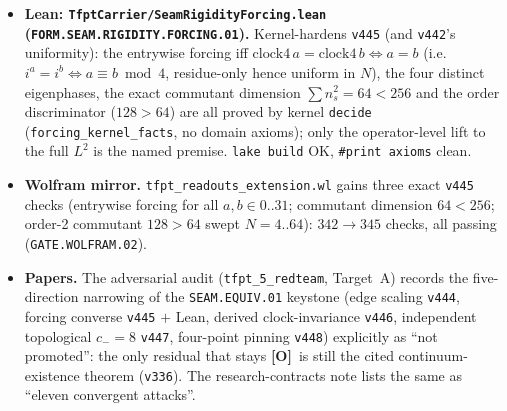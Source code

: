 \documentclass[11pt]{article}
\providecommand{\mE}{\textbf{[E]}}\providecommand{\mC}{\textbf{[C]}}
\providecommand{\mO}{\textbf{[O]}}\providecommand{\mX}{\textbf{[X]}}
\begin{document}
\begin{itemize}
external MMST fact (continuum existence of the chiral scaling limit) empirically at the next order. \mE\ the
ground-state correlation matrix is an exact projector $G^2{=}G$ ($\sim10^{-13}$), so the state is quasi-free (the
MMST CAR hypothesis holds); \mE\ the edge four-point cross-ratio $Q{=}[G_{01}G_{23}]/[G_{02}G_{13}]$ at commensurate
positions is Cauchy-convergent under refinement; \mE\ $Q$ converges to the free-fermion conformal cross-ratio
$\sin(5\pi/12)/\sin(\pi/12){=}2{+}\sqrt3\approx3.732$; \mE\ the bulk control is off-scale (exponential). \mC\ so the
one external fact is supported at \emph{both} two-point (\texttt{v444}) and four-point order. \texttt{SEAM.EQUIV.01}
stays \mO.
\item \textbf{Lean: \texttt{TfptCarrier/SeamRigidityForcing.lean} (\texttt{FORM.SEAM.RIGIDITY.FORCING.01}).}
Kernel-hardens \texttt{v445} (and \texttt{v442}'s uniformity): the entrywise forcing iff
$\mathrm{clock4}\,a{=}\mathrm{clock4}\,b\Leftrightarrow a{=}b$ (i.e.\ $i^a{=}i^b\Leftrightarrow a\equiv b\bmod4$,
residue-only hence uniform in $N$), the four distinct eigenphases, the exact commutant dimension
$\sum n_s^2{=}64{<}256$ and the order discriminator ($128{>}64$) are all proved by kernel \texttt{decide}
(\texttt{forcing\_kernel\_facts}, no domain axioms); only the operator-level lift to the full $L^2$ is the named
premise. \texttt{lake build} OK, \texttt{\#print axioms} clean.
\item \textbf{Wolfram mirror.} \texttt{tfpt\_readouts\_extension.wl} gains three exact \texttt{v445} checks (entrywise
forcing for all $a,b\in0..31$; commutant dimension $64{<}256$; order-2 commutant $128{>}64$ swept $N{=}4..64$):
$342\to345$ checks, all passing (\texttt{GATE.WOLFRAM.02}).
\item \textbf{Papers.} The adversarial audit (\texttt{tfpt\_5\_redteam}, Target~A) records the five-direction
narrowing of the \texttt{SEAM.EQUIV.01} keystone (edge scaling \texttt{v444}, forcing converse \texttt{v445}
$+$ Lean, derived clock-invariance \texttt{v446}, independent topological $c_-{=}8$ \texttt{v447}, four-point
pinning \texttt{v448}) explicitly as ``not promoted'': the only residual that stays \mO\ is still the cited
continuum-existence theorem (\texttt{v336}). The research-contracts note lists the same as ``eleven convergent
attacks''.
\end{itemize}
\end{document}

